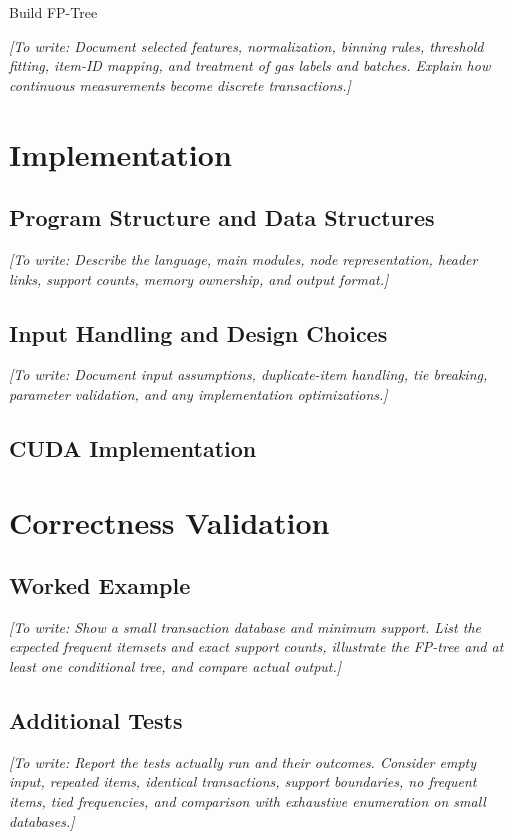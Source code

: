 \documentclass[12pt,letterpaper]{article}
\newcommand{\placeholder}[1]{\par\noindent\textit{[To write: #1]}\par}
\begin{document}
Build FP-Tree 
\placeholder{Document selected features, normalization, binning rules,
threshold fitting, item-ID mapping, and treatment of gas labels and batches.
Explain how continuous measurements become discrete transactions.}

\section{Implementation}
\label{sec:implementation}
\subsection{Program Structure and Data Structures}
\placeholder{Describe the language, main modules, node representation,
header links, support counts, memory ownership, and output format.}

\subsection{Input Handling and Design Choices}
\placeholder{Document input assumptions, duplicate-item handling,
tie breaking, parameter validation, and any implementation optimizations.}

\subsection{CUDA Implementation}


\section{Correctness Validation}
\label{sec:validation}
\subsection{Worked Example}
\placeholder{Show a small transaction database and minimum support.
List the expected frequent itemsets and exact support counts, illustrate
the FP-tree and at least one conditional tree, and compare actual output.}

\subsection{Additional Tests}
\placeholder{Report the tests actually run and their outcomes. Consider
empty input, repeated items, identical transactions, support boundaries,
no frequent items, tied frequencies, and comparison with exhaustive enumeration
on small databases.}
\end{document}
